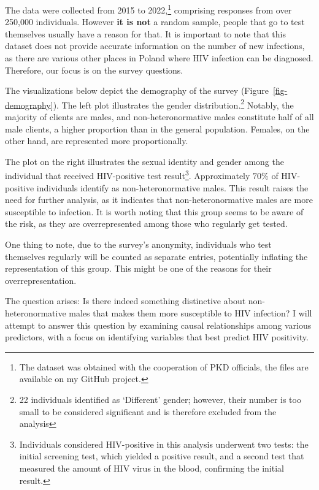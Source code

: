 \documentclass[
  12pt,
  letterpaper,
  DIV=11,
  numbers=noendperiod]{scrartcl}
\begin{document}
The data were collected from 2015 to 2022,\footnote{The dataset was
  obtained with the cooperation of PKD officials, the files are
  available on my GitHub project.} comprising responses from over
250,000 individuals. However \textbf{it is not} a random sample, people
that go to test themselves usually have a reason for that. It is
important to note that this dataset does not provide accurate
information on the number of new infections, as there are various other
places in Poland where HIV infection can be diagnosed. Therefore, our
focus is on the survey questions.

The visualizations below depict the demography of the survey
(Figure~\ref{fig-demography}). The left plot illustrates the gender
distribution.\footnote{22 individuals identified as `Different' gender;
  however, their number is too small to be considered significant and is
  therefore excluded from the analysis} Notably, the majority of clients
are males, and non-heteronormative males constitute half of all male
clients, a higher proportion than in the general population. Females, on
the other hand, are represented more proportionally.

The plot on the right illustrates the sexual identity and gender among
the individual that received HIV-positive test result\footnote{Individuals
  considered HIV-positive in this analysis underwent two tests: the
  initial screening test, which yielded a positive result, and a second
  test that measured the amount of HIV virus in the blood, confirming
  the initial result.}. Approximately \(70\%\) of HIV-positive
individuals identify as non-heteronormative males. This result raises
the need for further analysis, as it indicates that non-heteronormative
males are more susceptible to infection. It is worth noting that this
group seems to be aware of the risk, as they are overrepresented among
those who regularly get tested.

One thing to note, due to the survey's anonymity, individuals who test
themselves regularly will be counted as separate entries, potentially
inflating the representation of this group. This might be one of the
reasons for their overrepresentation.

The question arises: Is there indeed something distinctive about
non-heteronormative males that makes them more susceptible to HIV
infection? I will attempt to answer this question by examining causal
relationships among various predictors, with a focus on identifying
variables that best predict HIV positivity.
\end{document}
